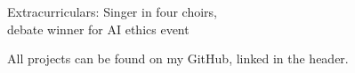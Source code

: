 
Extracurriculars: Singer in four choirs,\\
debate winner for AI ethics event







All projects can be found on my GitHub, linked in the header.

